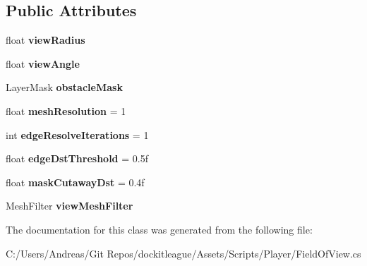 \subsection*{Public Attributes}
\begin{DoxyCompactItemize}
\item 
\hypertarget{class_field_of_view_af53fd64c403d07537b64ba9c3c479d66}{}\label{class_field_of_view_af53fd64c403d07537b64ba9c3c479d66} 
float {\bfseries view\+Radius}
\item 
\hypertarget{class_field_of_view_a9348423f9a49cb7ddcac02cc330add60}{}\label{class_field_of_view_a9348423f9a49cb7ddcac02cc330add60} 
float {\bfseries view\+Angle}
\item 
\hypertarget{class_field_of_view_a5efaecfa27a253a5d85e5a86733bfd4a}{}\label{class_field_of_view_a5efaecfa27a253a5d85e5a86733bfd4a} 
Layer\+Mask {\bfseries obstacle\+Mask}
\item 
\hypertarget{class_field_of_view_aa5df1196d9d0f68c7a7a2fa5fb3ba97b}{}\label{class_field_of_view_aa5df1196d9d0f68c7a7a2fa5fb3ba97b} 
float {\bfseries mesh\+Resolution} = 1
\item 
\hypertarget{class_field_of_view_aca980d556fa69c80b3f1ffd2d321589a}{}\label{class_field_of_view_aca980d556fa69c80b3f1ffd2d321589a} 
int {\bfseries edge\+Resolve\+Iterations} = 1
\item 
\hypertarget{class_field_of_view_a017fa1c0a4abf1840083a266aff67a3e}{}\label{class_field_of_view_a017fa1c0a4abf1840083a266aff67a3e} 
float {\bfseries edge\+Dst\+Threshold} = 0.\+5f
\item 
\hypertarget{class_field_of_view_a6ad8d1ee9db6dff0621bb47048236548}{}\label{class_field_of_view_a6ad8d1ee9db6dff0621bb47048236548} 
float {\bfseries mask\+Cutaway\+Dst} = 0.\+4f
\item 
\hypertarget{class_field_of_view_ab8a3df0035ba21b77d663773cbf82599}{}\label{class_field_of_view_ab8a3df0035ba21b77d663773cbf82599} 
Mesh\+Filter {\bfseries view\+Mesh\+Filter}
\end{DoxyCompactItemize}


The documentation for this class was generated from the following file\+:\begin{DoxyCompactItemize}
\item 
C\+:/\+Users/\+Andreas/\+Git Repos/dockitleague/\+Assets/\+Scripts/\+Player/Field\+Of\+View.\+cs\end{DoxyCompactItemize}
